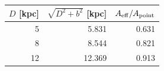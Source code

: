 \begin{tabular}{rrr}\toprule
$D$ [kpc] & $\sqrt{D^2+b^2}$ [kpc] & $A_{\rm eff}/A_{\rm point}$ \\
\midrule
5 & 5.831 & 0.631 \\
8 & 8.544 & 0.821 \\
12 & 12.369 & 0.913 \\
\bottomrule\end{tabular}
